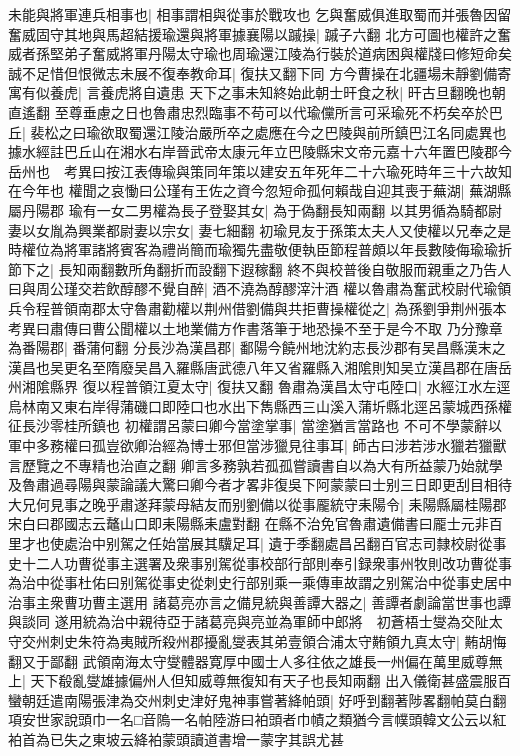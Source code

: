 未能與將軍連兵相事也|{
	相事謂相與從事於戰攻也}
乞與奮威俱進取蜀而并張魯因留奮威固守其地與馬超結援瑜還與將軍據襄陽以䠞操|{
	䠞子六翻}
北方可圖也權許之奮威者孫堅弟子奮威將軍丹陽太守瑜也周瑜還江陵為行裝於道病困與權牋曰修短命矣誠不足惜但恨微志未展不復奉教命耳|{
	復扶又翻下同}
方今曹操在北疆場未靜劉備寄寓有似養虎|{
	言養虎將自遺患}
天下之事未知終始此朝士旰食之秋|{
	旰古旦翻晚也朝直遙翻}
至尊垂慮之日也魯肅忠烈臨事不苟可以代瑜儻所言可采瑜死不朽矣卒於巴丘|{
	裴松之曰瑜欲取蜀還江陵治嚴所卒之處應在今之巴陵與前所鎮巴江名同處異也據水經註巴丘山在湘水右岸晉武帝太康元年立巴陵縣宋文帝元嘉十六年置巴陵郡今岳州也　考異曰按江表傳瑜與策同年策以建安五年死年二十六瑜死時年三十六故知在今年也}
權聞之哀慟曰公瑾有王佐之資今忽短命孤何賴哉自迎其喪于蕪湖|{
	蕪湖縣屬丹陽郡}
瑜有一女二男權為長子登娶其女|{
	為于偽翻長知兩翻}
以其男循為騎都尉妻以女胤為興業都尉妻以宗女|{
	妻七細翻}
初瑜見友于孫策太夫人又使權以兄奉之是時權位為將軍諸將賓客為禮尚簡而瑜獨先盡敬便執臣節程普頗以年長數陵侮瑜瑜折節下之|{
	長知兩翻數所角翻折而設翻下遐稼翻}
終不與校普後自敬服而親重之乃告人曰與周公瑾交若飲醇醪不覺自醉|{
	酒不澆為醇醪滓汁酒}
權以魯肅為奮武校尉代瑜領兵令程普領南郡太守魯肅勸權以荆州借劉備與共拒曹操權從之|{
	為孫劉爭荆州張本　考異曰肅傳曰曹公聞權以土地業備方作書落筆于地恐操不至于是今不取}
乃分豫章為番陽郡|{
	番蒲何翻}
分長沙為漢昌郡|{
	鄱陽今饒州地沈約志長沙郡有吴昌縣漢末之漢昌也吴更名至隋廢吴昌入羅縣唐武德八年又省羅縣入湘隂則知吴立漢昌郡在唐岳州湘隂縣界}
復以程普領江夏太守|{
	復扶又翻}
魯肅為漢昌太守屯陸口|{
	水經江水左逕烏林南又東右岸得蒲磯口即陸口也水出下雋縣西三山溪入蒲圻縣北逕呂蒙城西孫權征長沙零桂所鎮也}
初權謂呂蒙曰卿今當塗掌事|{
	當塗猶言當路也}
不可不學蒙辭以軍中多務權曰孤豈欲卿治經為博士邪但當涉獵見往事耳|{
	師古曰涉若涉水獵若獵獸言歷覽之不專精也治直之翻}
卿言多務孰若孤孤嘗讀書自以為大有所益蒙乃始就學及魯肅過尋陽與蒙論議大驚曰卿今者才畧非復吳下阿蒙蒙曰士别三日即更刮目相待大兄何見事之晚乎肅遂拜蒙母結友而别劉備以從事龎統守耒陽令|{
	耒陽縣屬桂陽郡宋白曰郡國志云鼇山口即耒陽縣耒盧對翻}
在縣不治免官魯肅遺備書曰龎士元非百里才也使處治中别駕之任始當展其驥足耳|{
	遺于季翻處昌呂翻百官志司隸校尉從事史十二人功曹從事主選署及衆事别駕從事校部行部則奉引録衆事州牧則改功曹從事為治中從事杜佑曰别駕從事史從刺史行部别乘一乘傳車故謂之别駕治中從事史居中治事主衆曹功曹主選用}
諸葛亮亦言之備見統與善譚大器之|{
	善譚者劇論當世事也譚與談同}
遂用統為治中親待亞于諸葛亮與亮並為軍師中郎將　初蒼梧士燮為交阯太守交州刺史朱符為夷賊所殺州郡擾亂燮表其弟壹領合浦太守䵋領九真太守|{
	䵋胡悔翻又于鄙翻}
武領南海太守燮體器寛厚中國士人多往依之雄長一州偏在萬里威尊無上|{
	天下殽亂燮雄據偏州人但知威尊無復知有天子也長知兩翻}
出入儀衛甚盛震服百蠻朝廷遣南陽張津為交州刺史津好鬼神事嘗著絳帕頭|{
	好呼到翻著陟畧翻帕莫白翻項安世家說頭巾一名□音隖一名帕陸游曰袙頭者巾幘之類猶今言幞頭韓文公云以紅袙首為已失之東坡云絳袙蒙頭讀道書增一蒙字其誤尤甚}
